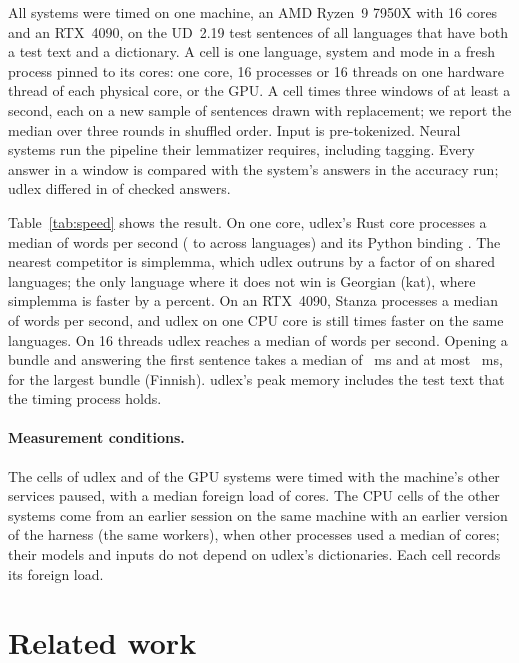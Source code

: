 \documentclass[11pt]{article}
\begin{document}
All systems were timed on one machine, an AMD Ryzen~9 7950X with 16 cores
and an RTX~4090, on the UD~2.19 test sentences of all \speedLangs{} languages
that have both a test text and a dictionary. A cell is one language, system
and mode in a fresh process pinned to its cores: one core, 16 processes or
16 threads on one hardware thread of each physical core, or the GPU. A cell
times three windows of at least a second, each on a new sample of sentences
drawn with replacement; we report the median over three rounds in shuffled
order. Input is pre-tokenized. Neural systems run the pipeline their
lemmatizer requires, including tagging. Every answer in a window is compared
with the system's answers in the accuracy run; udlex differed in
\speedMismatch{} of \speedChecked{} checked answers.

Table~\ref{tab:speed} shows the result. On one core, udlex's Rust core
processes a median of \speedRsOneMedian{} words per second
(\speedRsOneMin{} to \speedRsOneMax{} across languages) and its Python
binding \speedPyOneMedian. The nearest competitor is simplemma, which udlex
outruns by a factor of \speedsimplemmaUp{} on \speedsimplemmaN{} shared
languages; the only language where it does not win is Georgian (kat), where
simplemma is faster by a percent. On an RTX~4090, Stanza processes a median
of \speedstanzaGpu{} words per second, and udlex on one CPU core is still
\speedstanzaGpuOneUp{} times faster on the same languages. On 16
threads udlex reaches a median of \speedRsSixteenMedian{} words per second.
Opening a bundle and answering the first sentence takes a median of
\loadRsMedianMs{}~ms and at most \loadRsMaxMs~ms, for the largest bundle
(Finnish). udlex's peak memory includes the test text that the timing
process holds.

\paragraph{Measurement conditions.} The \cellsNew{} cells of udlex and of the
GPU systems were timed with the machine's other services paused, with a
median foreign load of \foreignNew{} cores. The \cellsReused{} CPU cells of
the other systems come from an earlier session on the same machine with an
earlier version of the harness (the same workers), when other processes used a
median of \foreignReused{} cores;
their models and inputs do not depend on udlex's dictionaries. Each cell
records its foreign load.

\section{Related work}
\end{document}

